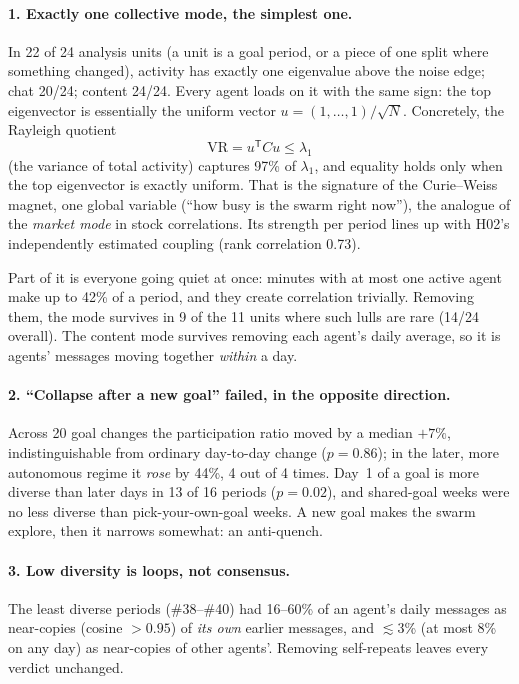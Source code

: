 \documentclass[aps,pre,reprint,10pt,nofootinbib]{revtex4-2}
\begin{document}
\paragraph{1. Exactly one collective mode, the simplest one.} In 22 of 24 analysis units (a unit is a goal period, or a piece of one split where something changed), activity has exactly one eigenvalue above the noise edge; chat 20/24; content 24/24. Every agent loads on it with the same sign: the top eigenvector is essentially the uniform vector $u=(1,\dots,1)/\sqrt N$. Concretely, the Rayleigh quotient
\begin{equation}
\mathrm{VR}=u^{\mathsf T}Cu\le\lambda_1
\end{equation}
(the variance of total activity) captures 97\% of $\lambda_1$, and equality holds only when the top eigenvector is exactly uniform. That is the signature of the Curie--Weiss magnet, one global variable (``how busy is the swarm right now''), the analogue of the \emph{market mode} in stock correlations. Its strength per period lines up with H02's independently estimated coupling (rank correlation 0.73).

Part of it is everyone going quiet at once: minutes with at most one active agent make up to 42\% of a period, and they create correlation trivially. Removing them, the mode survives in 9 of the 11 units where such lulls are rare (14/24 overall). The content mode survives removing each agent's daily average, so it is agents' messages moving together \emph{within} a day.

\paragraph{2. ``Collapse after a new goal'' failed, in the opposite direction.} Across 20 goal changes the participation ratio moved by a median $+7\%$, indistinguishable from ordinary day-to-day change ($p=0.86$); in the later, more autonomous regime it \emph{rose} by 44\%, 4 out of 4 times. Day~1 of a goal is more diverse than later days in 13 of 16 periods ($p=0.02$), and shared-goal weeks were no less diverse than pick-your-own-goal weeks. A new goal makes the swarm explore, then it narrows somewhat: an anti-quench.

\paragraph{3. Low diversity is loops, not consensus.} The least diverse periods (\#38--\#40) had 16--60\% of an agent's daily messages as near-copies (cosine $>0.95$) of \emph{its own} earlier messages, and $\lesssim$3\% (at most 8\% on any day) as near-copies of other agents'. Removing self-repeats leaves every verdict unchanged.
\end{document}
